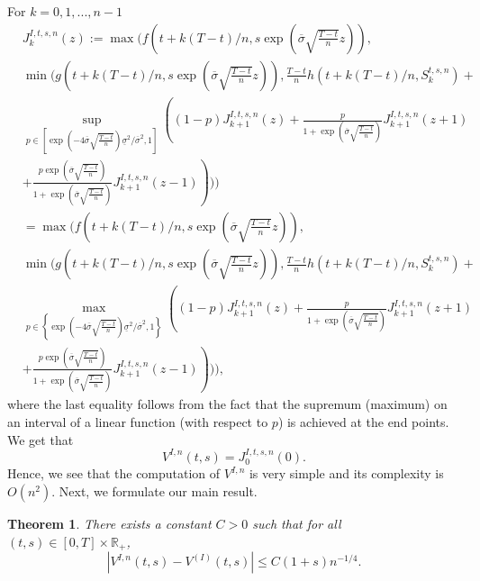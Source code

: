 \documentclass{amsart}
\newtheorem{thm}{Theorem}[section]
\numberwithin{equation}{section}
\begin{document}
For $k=0,1,...,n-1$
\begin{eqnarray}\label{recursion2}
&{J}^{I,t,s,n}_k(z):=\max\bigg(f\left(t+k (T-t)/n,s \exp\left(\overline{\sigma}\sqrt{\frac{T-t}{n}}z\right)\right), \\
&\min \bigg(g\left(t+k(T-t)/n,s \exp\left(\overline{\sigma}\sqrt{\frac{T-t}{n}}z\right)\right),\frac{T-t}{n}h\left(t+k(T-t)/n,S^{t,s,n}_{k}\right)+\nonumber\\
&\sup_{p\in \left[\exp\left(-4\overline{\sigma}\sqrt{\frac{T-t}{n}}\right)\underline{\sigma}^2/\overline{\sigma}^2,1\right]}\left((1-p)J^{I,t,s,n}_{k+1}(z)+
\frac{p}{1+\exp\left(\overline{\sigma}\sqrt{\frac{T-t}{n}}\right)}J^{I,t,s,n}_{k+1}(z+1)\right.\nonumber \\
&\left. +
\frac{p\exp\left(\overline{\sigma}\sqrt{\frac{T-t}{n}}\right)}{1+\exp\left(\overline{\sigma}\sqrt{\frac{T-t}{n}}\right)}J^{I,t,s,n}_{k+1}(z-1)\right)\bigg)\bigg)\nonumber\\
&=\max\bigg(f\left(t+k (T-t)/n,s \exp\left(\overline{\sigma}\sqrt{\frac{T-t}{n}}z\right)\right), \nonumber\\
&\min \bigg(g\left(t+k(T-t)/n,s \exp\left(\overline{\sigma}\sqrt{\frac{T-t}{n}}z\right)\right),\frac{T-t}{n}h\left(t+k(T-t)/n,S^{t,s,n}_{k}\right)+\nonumber\\
&\max_{p\in \left\{\exp\left(-4\overline{\sigma}\sqrt{\frac{T-t}{n}}\right)\underline{\sigma}^2/\overline{\sigma}^2,1\right\}}
\left((1-p)J^{I,t,s,n}_{k+1}(z)+\frac{p}{1+\exp\left(\overline{\sigma}\sqrt{\frac{T-t}{n}}\right)}J^{I,t,s,n}_{k+1}(z+1)\right. \nonumber\\
&\left. +
\frac{p\exp\left(\overline{\sigma}\sqrt{\frac{T-t}{n}}\right)}{1+\exp\left(\overline{\sigma}\sqrt{\frac{T-t}{n}}\right)}J^{I,t,s,n}_{k+1}(z-1)\right)\bigg)\bigg),\nonumber
\end{eqnarray}
where the last equality follows from the fact that the supremum (maximum) on an interval of a linear function (with respect to $p$)
is achieved at the end points.
We get that
\begin{equation}\label{recursion3}
V^{I,n}(t,s)=J^{I,t,s,n}_0(0).
\end{equation}
Hence, we see that the computation of $V^{I,n}$ is very simple and its complexity is $O(n^2)$.
Next, we formulate our main result.
\begin{thm}\label{thm2.1}
There exists a constant $C>0$ such that for all $(t,s)\in [0,T]\times\mathbb R_{+}$,
\[|V^{I,n}(t,s)-V^{(I)}(t,s)|\leq C(1+s) n^{-1/4}.\]
\end{thm}
\end{document}
